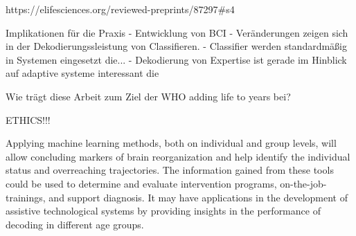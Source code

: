 https://elifesciences.org/reviewed-preprints/87297#s4

Implikationen für die Praxis 
- Entwicklung von BCI 
- Veränderungen zeigen sich in der Dekodierungssleistung von Classifieren. 
- Classifier werden standardmäßig in Systemen eingesetzt die...
- Dekodierung von Expertise ist gerade im Hinblick auf adaptive systeme interessant die 

Wie trägt diese Arbeit zum Ziel der WHO adding life to years bei?

ETHICS!!!

\noindent Applying machine learning methods, both on individual and group levels, will allow concluding markers of brain reorganization and help identify the individual status and overreaching trajectories. The information gained from these tools could be used to determine and evaluate intervention programs, on-the-job-trainings, and support diagnosis. It may have applications in the development of assistive technological systems by providing insights in the performance of decoding in different age groups. 
